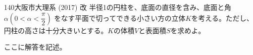 \begin{thm}{140}{}{大阪市大理系 (2017) 改}
 半径1の円柱を、底面の直径を含み、底面と角$\alpha (0<\alpha<\dfrac{\pi}{2})$ をなす平面で切ってできる小さい方の立体$K$を考える。ただし、円柱の高さは十分大きいとする。$K$の体積$V$と表面積$S$を求めよ。
\end{thm}

ここに解答を記述。